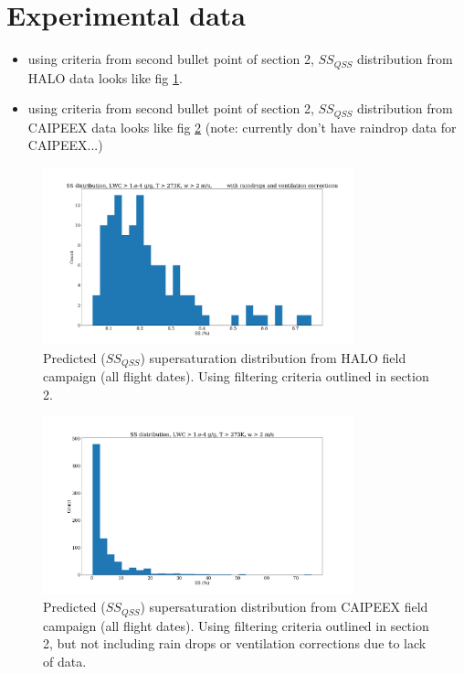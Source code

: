 \documentclass{article}
\begin{document}
\section{Experimental data}
\begin{itemize}
	\item using criteria from second bullet point of section 2, $SS_{QSS}$ distribution from HALO data looks like fig \ref{haloqsshist}. 
	\item using criteria from second bullet point of section 2, $SS_{QSS}$ distribution from CAIPEEX data looks like fig \ref{caipeexqsshist} (note: currently don't have raindrop data for CAIPEEX...)
\end{itemize}
\begin{figure}[ht]
    \centering
    \includegraphics[width=9cm]{halo/v3_ss_with_cip_from_cas_alldates_figure.png}
    \caption{Predicted ($SS_{QSS}$) supersaturation distribution from HALO field campaign (all flight dates). Using filtering criteria outlined in section 2.}
    \label{haloqsshist}
\end{figure}
\begin{figure}[ht]
    \centering
    \includegraphics[width=9cm]{caipeex/v1_ss_from_dsd_alldates_figure.png}
    \caption{Predicted ($SS_{QSS}$) supersaturation distribution from CAIPEEX field campaign (all flight dates). Using filtering criteria outlined in section 2, but not including rain drops or ventilation corrections due to lack of data.}
    \label{caipeexqsshist}
\end{figure}
\end{document}
